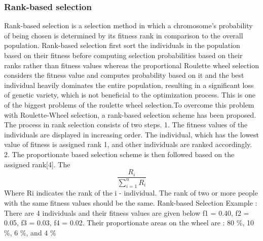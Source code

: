 \documentclass{article}
\begin{document}
  
\subsubsection{Rank-based selection}
Rank-based selection is a selection method in which a chromosome's probability of being chosen is determined by
its fitness rank in comparison to the overall population. Rank-based selection first sort the individuals in the
population based on their fitness before computing selection probabilities based on their ranks rather than fitness
values whereas the proportional Roulette wheel selection considers the fitness value and computes probability based
on it and the best individual heavily dominates the entire population, resulting in a significant loss of genetic variety,
which is not beneficial to the optimization process. This is one of the biggest problems of the roulette wheel
selection.To overcome this problem with Roulette-Wheel selection, a rank-based selection scheme has been
proposed. The process in rank selection consists of two steps. 1. The fitness values of the individuals are displayed
in increasing order. The individual, which has the lowest value of fitness is assigned rank 1, and other individuals
are ranked accordingly. 2. The proportionate based selection scheme is then followed based on the assigned rank[4].
The %
\[ 
\frac{R_i}{\sum^{n}_{i=1} R_i}
\]
Where Ri indicates the rank of the i - individual. The rank of two or more people with the same fitness values should
be the same. Rank-based Selection Example : There are 4 individuals and their fitness values are given below f1 =
0.40, f2 = 0.05, f3 = 0.03, f4 = 0.02. Their proportionate areas on the wheel are :  80 \%, 10 \%, 6 \%, and 4 \%
\end{document}
